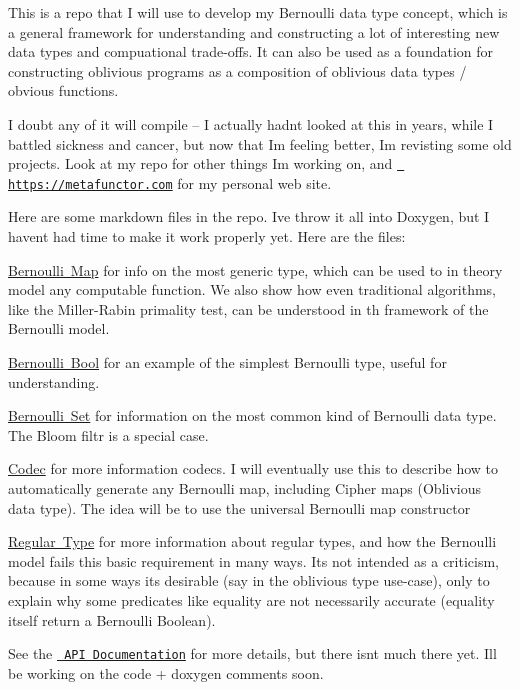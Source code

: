 This is a repo that I will use to develop my Bernoulli data type concept, which is a general framework for understanding and constructing a lot of interesting new data types and compuational trade-\/offs. It can also be used as a foundation for constructing oblivious programs as a composition of oblivious data types / obvious functions.

I doubt any of it will compile -- I actually hadn\textquotesingle{}t looked at this in years, while I battled sickness and cancer, but now that I\textquotesingle{}m feeling better, I\textquotesingle{}m revisting some old projects. Look at my repo for other things I\textquotesingle{}m working on, and \href{https://metafunctor.com}{\texttt{ https\+://metafunctor.\+com}} for my personal web site.

Here are some markdown files in the repo. I\textquotesingle{}ve throw it all into Doxygen, but I haven\textquotesingle{}t had time to make it work properly yet. Here are the files\+:


\begin{DoxyItemize}
\item \mbox{\hyperlink{md_BERNOULLI_MAP}{Bernoulli Map}} for info on the most generic type, which can be used to in theory model any computable function. We also show how even traditional algorithms, like the Miller-\/\+Rabin primality test, can be understood in th framework of the Bernoulli model.
\item \mbox{\hyperlink{md_BERNOULLI_BOOL}{Bernoulli Bool}} for an example of the simplest Bernoulli type, useful for understanding.
\item \mbox{\hyperlink{md_BERNOULLI_SET}{Bernoulli Set}} for information on the most common kind of Bernoulli data type. The Bloom filtr is a special case.
\item \mbox{\hyperlink{codec_md_CODEC}{Codec}} for more information codecs. I will eventually use this to describe how to automatically generate any Bernoulli map, including Cipher maps (Oblivious data type). The idea will be to use the universal Bernoulli map constructor
\item \mbox{\hyperlink{regular_type_md_REGULAR_TYPE_CONCEPT}{Regular Type}} for more information about regular types, and how the Bernoulli model fails this basic requirement in many ways. It\textquotesingle{}s not intended as a criticism, because in some ways it\textquotesingle{}s desirable (say in the oblivious type use-\/case), only to explain why some predicates like equality are not necessarily accurate (equality itself return a Bernoulli Boolean).
\end{DoxyItemize}

See the \href{docs/html/index.html}{\texttt{ API Documentation}} for more details, but there isn\textquotesingle{}t much there yet. I\textquotesingle{}ll be working on the code + doxygen comments soon. 